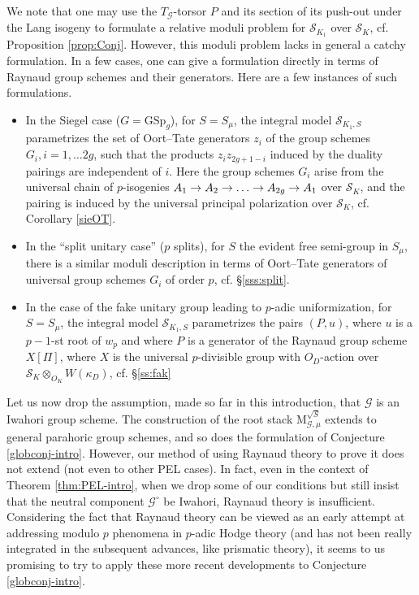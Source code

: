 \documentclass[reqno, 10pt]{amsart}
\makeatletter
\newcommand{\CG}{\ensuremath{\mathcal {G}}\xspace}
\newcommand{\CS}{\ensuremath{\mathcal {S}}\xspace}
\newcommand{\GSp}{\mathrm{GSp}}
\theoremstyle{definition}
\numberwithin{equation}{subsection}
\numberwithin{subsubsection}{subsection}
\renewcommand{\to}{%
   \ifbool{@display}{\longrightarrow}{\rightarrow}%
   }
\newcommand{\Mlocroot}{{\mathrm M}^{\sqrt{S}}}
\makeatother
\begin{document}
 We note that one may use the  $T_\CG$-torsor $P$ and its section of its push-out under the Lang isogeny to formulate a relative moduli problem for $\CS_{K_1}$ over $\CS_K$, cf. Proposition \ref{prop:Conj}. However, this moduli problem lacks in general a catchy formulation. In a few cases, one can give a formulation directly in terms of Raynaud group schemes and their generators. Here are a few instances of such formulations.
 
 \begin{itemize}
 \item In the Siegel case ($G=\GSp_g$), for $S=S_\mu$, the integral model $\CS_{K_1, S}$ parametrizes the set of Oort--Tate generators $z_i$ of the group schemes $G_i, i=1, \ldots 2g$, such that the products $z_i z_{2g+1-i}$ induced by the duality pairings are independent of $i$. Here the group schemes $G_i$ arise from the universal chain of $p$-isogenies $A_1\to A_2\to\ldots\to A_{2g}\to A_1$ over $\CS_K$, and the pairing is induced by the universal principal polarization over $\CS_K$, cf. Corollary  \ref{sieOT}. 
 \item In the ``split unitary case'' ($p$ splits), for $S$ the evident free semi-group in $S_\mu$, there is a similar moduli description in terms of Oort--Tate generators of universal group schemes $G_i$ of order $p$, cf. \S \ref{sss:split}.
 \item In the case of the fake unitary group leading to $p$-adic uniformization, for $S=S_\mu$, the integral model $\CS_{K_1, S}$ parametrizes the pairs $(P, u)$, where $u$ is a $p-1$-st root of $w_p$ and where $P$ is a generator of the Raynaud group scheme $X[\Pi]$, where $X$ is the universal $p$-divisible group with $O_D$-action over $\CS_K\otimes_{O_K}W(\kappa_D)$, cf. \S \ref{ss:fak}
 \end{itemize}
 
 Let us now drop the assumption, made so far in  this introduction, that $\CG$ is an Iwahori group scheme. The construction of the root stack $ \Mlocroot_{\CG,\mu}$ extends to general parahoric group schemes, and so does the formulation of Conjecture \ref{globconj-intro}. However, our method of using Raynaud theory to prove it does not extend (not even to other PEL cases). In fact, even in the context of Theorem \ref{thm:PEL-intro}, when we drop some of our conditions   but still insist that the neutral component $\CG^\circ$ be  Iwahori, Raynaud theory is insufficient. Considering the fact that Raynaud theory can be viewed as an early attempt at addressing modulo $p$ phenomena  in $p$-adic Hodge theory (and  has not been really integrated in the subsequent advances, like prismatic theory), it seems to us promising to try to apply these more recent developments to Conjecture \ref{globconj-intro}. 
 
\end{document}

